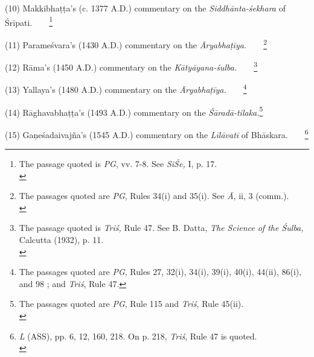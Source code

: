 \documentclass[10pt, openany]{book}
\begin{document}
 {(10) Makkibhaṭṭa's (c. 1377 A.D.) commentary on the \textit{Siddhānta-śekhara} of Śrīpati.~~~~\renewcommand{\thefootnote}{\hspace{-4.5mm} 7}\footnote{\hspace{-2mm} \englishfont The passage quoted is \textit{PG}, vv. 7-8. See \textit{SiŚe,} I, p. 17.\\}}
\vspace{2mm}

 (11) Parameśvara's (1430 A.D.) commentary on the \textit{{Āryabhaṭīya.}}~~~~\renewcommand{\thefootnote}{\hspace{-4.5mm} 8}\footnote{\hspace{-2mm} \englishfont The passages quoted are \textit{PG}, Rules 34(i) and 35(i). See \textit{Ā}, ii, 3 (comm.).\\}
\vspace{2mm}

(12) Rāma's (1450 A.D.) commentary on the \textit{Kātyāyana-śulba.}~~~~\renewcommand{\thefootnote}{\hspace{-4.5mm} 9}\footnote{\hspace{-2mm} \englishfont The passage quoted is \textit{Triś,} Rule 47. See B. Datta, \textit{The Science of the Śulba,} Calcutta (1932), p. 11.\\}
\vspace{2mm}

(13) Yallaya's (1480 A.D.) commentary on the {\textit{Āryabhaṭīya.}}~~~~\renewcommand{\thefootnote}{\hspace{-4.5mm} 10}\footnote{\hspace{-2mm} \englishfont The passages quoted are \textit{PG}, Rules 27, 32(i), 34(i), 39(i), 40(i), 44(ii), 86(i), and 98 ; and \textit{Triś}, Rule 47.}

\newpage

\englishfont (14) Rāghavabhaṭṭa's (1493 A.D.) commentary on the \textit{Śāradā-tilaka.}\renewcommand{\thefootnote}{1}\footnote{\hspace{-2mm} \englishfont The passages quoted are \textit{PG}, Rule 115 and \textit{Triś}, Rule 45(ii).\\}
\vspace{2mm}

(15) Gaņeśadaivajña's (1545 A.D.) commentary on the \textit{Līlāvatī} of Bhāskara.~~~~\renewcommand{\thefootnote}{\hspace{-4.5mm} 2}\footnote{\hspace{-2mm} \englishfont \textit{L} (ASS), pp. 6, 12, 160, 218. On p. 218, \textit{Triś}, Rule 47 is quoted.\\}
\vspace{2mm}
\end{document}

